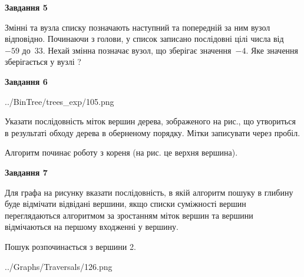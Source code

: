 \documentclass[12pt, ukrainian]{article}
\begin{document}
{\begin {large}
{\begin {center}\textbf{Завдання 5}\end {center}}\par
Змінні  та  вузла списку позначають наступний та попередній за ним вузол відповідно. Починаючи з голови, у список записано послідовні цілі числа від~$-59$ до~$33$. Нехай змінна  позначає вузол, що зберігає значення~$-4$.
Яке значення зберігається у вузлі  ?\par
\newpage

{\begin {center}\textbf{Завдання 6}\end {center}}\par

\begin{center}
	{../BinTree/trees_exp/105.png}
\end{center}
Указати послідовність міток вершин дерева, зображеного на рис., що утвориться в результаті обходу дерева в оберненому порядку. Мітки записувати через пробіл.\par Алгоритм починає роботу з кореня (на рис. це верхня вершина).\par
\newpage

{\begin {center}\textbf{Завдання 7}\end {center}}\par
Для графа на рисунку вказати послідовність, в якій алгоритм пошуку в глибину буде відмічати відвідані вершини, якщо списки суміжності вершин переглядаються алгоритмом за зростанням міток вершин та вершини відмічаються на першому вход\-женні у вершину.\par
Пошук розпочинається з вершини 2.\par

\begin{center}
	{../Graphs/Traversals/126.png}
\end{center}\par
\newpage


\end{large}}
\end{document}
